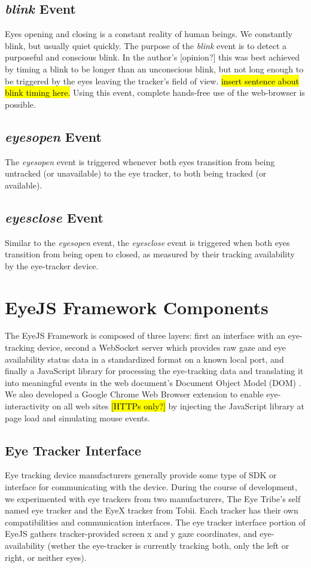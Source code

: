 \documentclass{sigchi}
\begin{document}
\subsection{\textbf{\textit{blink}} Event}
Eyes opening and closing is a constant reality of human beings. We constantly blink, but usually quiet quickly. The purpose of the \textit{blink} event is to detect a purposeful and conscious blink. In the author's [opinion?] this was best achieved by timing a blink to be longer than an unconscious blink, but not long enough to be triggered by the eyes leaving the tracker's field of view. \hl{insert sentence about blink timing here.} Using this event, complete hands-free use of the web-browser is possible.

\subsection{\textbf{\textit{eyesopen}} Event}
The \textit{eyesopen} event is triggered whenever both eyes transition from being untracked (or unavailable) to the eye tracker, to both being tracked (or available).

\subsection{\textbf{\textit{eyesclose}} Event}
Similar to the \textit{eyesopen} event, the \textit{eyesclose} event is triggered when both eyes transition from being open to closed, as measured by their tracking availability by the eye-tracker device.



\section{EyeJS Framework Components}
The EyeJS Framework is composed of three layers: first an interface with an eye-tracking device, second a WebSocket server \cite{websocket} which provides raw gaze and eye availability status data in a standardized format on a known local port, and finally a JavaScript library for processing the eye-tracking data and translating it into meaningful events in the web document's Document Object Model (DOM) \cite{domlevel1, domlevel2}. We also developed a Google Chrome Web Browser extension \cite{chromeextensions} to enable eye-interactivity on all web sites \hl{[HTTPs only?]} by injecting the JavaScript library at page load and simulating mouse events.


\subsection{Eye Tracker Interface}
Eye tracking device manufacturers generally provide some type of SDK or interface for communicating with the device. During the course of development, we experimented with eye trackers from two manufacturers, The Eye Tribe's self named eye tracker and the EyeX tracker from Tobii. Each tracker has their own compatibilities and communication interfaces. The eye tracker interface portion of EyeJS gathers tracker-provided screen x and y gaze coordinates, and eye-availability (wether the eye-tracker is currently tracking both, only the left or right, or neither eyes).
\end{document}
